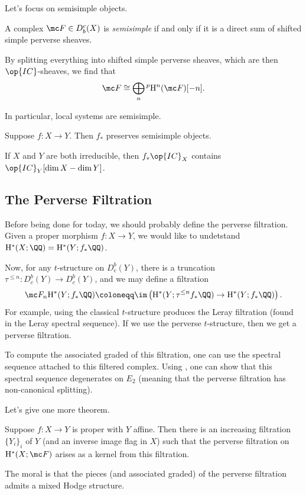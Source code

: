 \documentclass{article}
\begin{document}
Let's focus on semisimple objects.
\begin{definition}[semisimple]
	A complex $\mc F\in D_b^c(X)$ is \textit{semisimple} if and only if it is a direct sum of shifted simple perverse sheaves.
\end{definition}
\begin{remark}
	By splitting everything into shifted simple perverse sheaves, which are then $\op{IC}$-sheaves, we find that
	\[\mc F\cong\bigoplus_n{^p\mathrm H^n}(\mc F)[-n].\]
\end{remark}
In particular, local systems are semisimple.
\begin{theorem}[Decomposition] \label{thm:decomp}
	Suppose $f\colon X\to Y$. Then $f_*$ preserves semisimple objects.
\end{theorem}
\begin{remark}
	If $X$ and $Y$ are both irreducible, then $f_*\op{IC}_X$ contains $\op{IC}_Y[\dim X-\dim Y]$.
\end{remark}

\subsection{The Perverse Filtration}
Before being done for today, we should probably define the perverse filtration. Given a proper morphism $f\colon X\to Y$, we would like to undetstand $\mathrm H^*(X;\QQ)=\mathrm H^*(Y;f_*\QQ)$.

Now, for any $t$-structure on $D_c^b(Y)$, there is a truncation $\tau^{\le n}\colon D_c^b(Y)\to D_c^b(Y)$, and we may define a filtration
\[\mc F_n\mathrm H^*(Y;f_*\QQ)\coloneqq\im\left(\mathrm H^*(Y;\tau^{\le n}f_*\QQ)\to\mathrm H^*(Y;f_*\QQ)\right).\]
For example, using the classical $t$-structure produces the Leray filtration (found in the Leray spectral sequence). If we use the perverse $t$-structure, then we get a perverse filtration.
\begin{remark}
	To compute the associated graded of this filtration, one can use the spectral sequence attached to this filtered complex. Using , one can show that this spectral sequence degenerates on $E_2$ (meaning that the perverse filtration has non-canonical splitting).
\end{remark}
Let's give one more theorem.
\begin{theorem}
	Suppose $f\colon X\to Y$ is proper with $Y$ affine. Then there is an increasing filtration $\{Y_i\}_i$ of $Y$ (and an inverse image flag in $X$) such that the perverse filtration on $\mathrm H^*(X;\mc F)$ arises as a kernel from this filtration.
\end{theorem}
The moral is that the pieces (and associated graded) of the perverse filtration admits a mixed Hodge structure.
\end{document}
